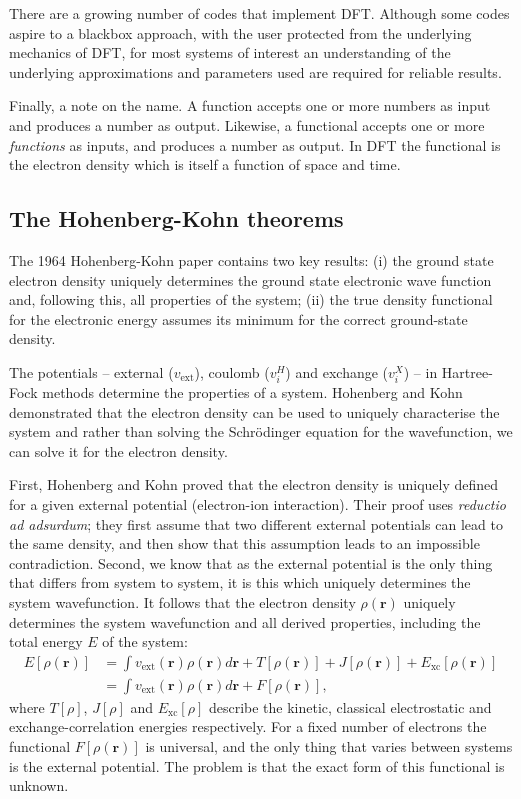 There are a growing number of codes that implement DFT. 
Although some codes aspire to a blackbox approach, with the user protected from the underlying mechanics of DFT, for most systems of interest an understanding of the underlying approximations and parameters used are required for reliable results.

Finally, a note on the name. A function accepts one or more numbers as input and produces a number as output. Likewise, a functional accepts one or more \textit{functions} as inputs, and produces a number as output. In DFT the functional is the electron density which is itself a function of space and time.

\subsection{The Hohenberg-Kohn theorems}

The 1964 Hohenberg-Kohn paper\autocite{Hohenberg1964} contains two key results: (i) the ground state electron density uniquely determines the ground state electronic wave function and, following this, all properties of the system; (ii) the true density functional for the electronic energy assumes its minimum for the correct ground-state density.\autocite{Scuseria05}

The potentials -- external ($v_\mathrm{ext}$), coulomb ($v_i^H$) and exchange ($v_i^X$) -- in Hartree-Fock methods determine the properties of a system. Hohenberg and Kohn demonstrated that the electron density can be used to uniquely characterise the system and rather than solving the Schr\"{o}dinger equation for the wavefunction, we can solve it for the electron density.

First, Hohenberg and Kohn proved that the electron density is uniquely defined for a given external potential (electron-ion interaction). Their proof uses \textit{reductio ad adsurdum}; they first assume that two different external potentials can lead to the same density, and then show that this assumption leads to an impossible contradiction.\autocite{Burke2007} 
Second, we know that as the external potential is the only thing that differs from system to system, it is this which uniquely determines the system wavefunction. It follows that the electron density $\rho(\textbf{r})$ uniquely determines the system wavefunction and all derived properties, including the total energy $E$ of the system:\autocite{Kaxiras2007}
\begin{align}
E\left[\rho(\textbf{r})\right]&=\int v_{\textrm{ext}}(\textbf{r})\rho(\textbf{r})d\textbf{r}+T\left[\rho(\textbf{r})\right]+J\left[\rho(\textbf{r})\right]+E_{\textrm{xc}}\left[\rho(\textbf{r})\right] \\
&=\int v_{\textrm{ext}}(\textbf{r})\rho(\textbf{r})d\textbf{r}+F\left[\rho(\textbf{r})\right],   
\end{align}
where $T\left[\rho\right]$, $J\left[\rho\right]$ and $E_\textrm{xc}\left[\rho\right]$ describe the kinetic, classical electrostatic and exchange-correlation energies respectively. 
For a fixed number of electrons the functional $F\left[\rho(\textbf{r})\right]$ is universal, and the only thing that varies between systems is the external potential. The problem is that the exact form of this functional is unknown.

